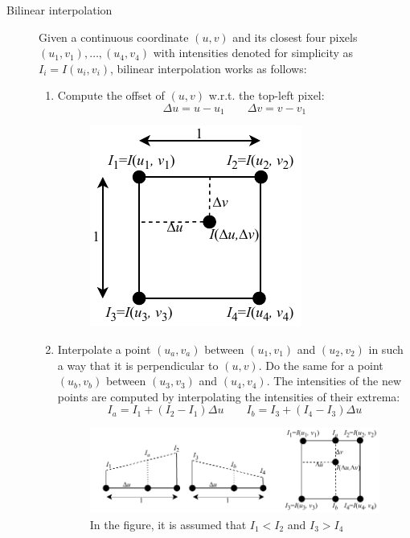 \begin{description}
    \item[Bilinear interpolation] 
        Given a continuous coordinate $(u, v)$ and 
        its closest four pixels $(u_1, v_1), \dots, (u_4, v_4)$ with intensities denoted for simplicity as $I_i = I(u_i, v_i)$,
        bilinear interpolation works as follows:
        \begin{enumerate}
            \item Compute the offset of $(u,v)$ w.r.t. the top-left pixel:
                \[ \Delta u = u - u_1 \hspace{2em} \Delta v = v - v_1 \]
                \begin{figure}[H]
                    \centering
                    \includegraphics[width=0.25\linewidth]{./img/_warping_bilinear1.pdf}
                \end{figure}

            \item Interpolate a point $(u_a, v_a)$ between $(u_1, v_1)$ and $(u_2, v_2)$ in such a way that it is perpendicular to $(u,v)$.
                Do the same for a point $(u_b, v_b)$ between $(u_3, v_3)$ and $(u_4, v_4)$.
                The intensities of the new points are computed by interpolating the intensities of their extrema:
                \[ I_a = I_1 + (I_2 - I_1) \Delta u \hspace{2em} I_b = I_3 + (I_4 - I_3) \Delta u \]

                \begin{figure}[H]
                    \centering
                    \includegraphics[width=0.7\linewidth]{./img/_warping_bilinear2.pdf}
                    \caption{In the figure, it is assumed that $I_1 < I_2$ and $I_3 > I_4$}
                \end{figure}
            

\end{enumerate}
\end{description}
